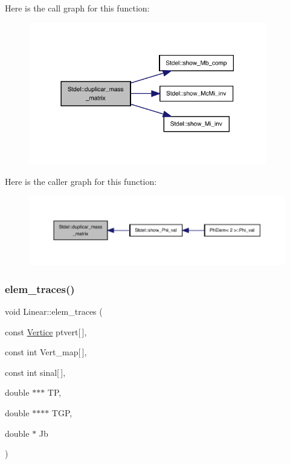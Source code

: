 Here is the call graph for this function\+:
\nopagebreak
\begin{figure}[H]
\begin{center}
\leavevmode
\includegraphics[width=294pt]{classStdel_a922b779be1f8f12b7a5535ab529bff64_cgraph}
\end{center}
\end{figure}
Here is the caller graph for this function\+:
\nopagebreak
\begin{figure}[H]
\begin{center}
\leavevmode
\includegraphics[width=350pt]{classStdel_a922b779be1f8f12b7a5535ab529bff64_icgraph}
\end{center}
\end{figure}
\mbox{\label{classLinear_a3d3eea37a4e7b5a4af20a70f8100e779}} 
\subsubsection{\texorpdfstring{elem\+\_\+traces()}{elem\_traces()}}
{\footnotesize\ttfamily void Linear\+::elem\+\_\+traces (\begin{DoxyParamCaption}\item[{const \hyperlink{structVertice}{Vertice}}]{ptvert\mbox{[}$\,$\mbox{]},  }\item[{const int}]{Vert\+\_\+map\mbox{[}$\,$\mbox{]},  }\item[{const int}]{sinal\mbox{[}$\,$\mbox{]},  }\item[{double $\ast$$\ast$$\ast$}]{TP,  }\item[{double $\ast$$\ast$$\ast$$\ast$}]{T\+GP,  }\item[{double $\ast$}]{Jb }\end{DoxyParamCaption})\hspace{0.3cm}{\ttfamily [virtual]}}



